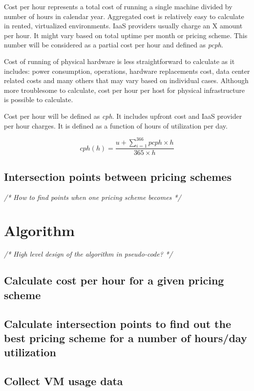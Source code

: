\documentclass[]{final_report}
\begin{document}
Cost per hour represents a total cost of running a single machine divided by number of hours in calendar year. Aggregated cost is relatively easy to calculate in rented, virtualized environments. IaaS providers usually charge an X amount per hour. It might vary based on total uptime per month or pricing scheme. This number will be considered as a partial cost per hour and defined as \textit{pcph}. \par
Cost of running of physical hardware is less straightforward to calculate as it includes: power consumption, operations, hardware replacements cost, data center related costs and many others that may vary based on individual cases. Although more troublesome to calculate, cost per hour per host for physical infrastructure is possible to calculate. \par
Cost per hour will be defined as \textit{cph}. It includes upfront cost and IaaS provider per hour charges. It is defined as a function of hours of utilization per day.  

\begin{equation}
cph(h) = \frac{u + \sum_{i=1}^{366} pcph \times h}{365 \times h}
\end{equation}

\subsection{Intersection points between pricing schemes}
\emph{/* How to find points when one pricing scheme becomes */}

\section{Algorithm}

\emph{/* High level design of the algorithm in pseudo-code? */}

\subsection{Calculate cost per hour for a given pricing scheme}
\subsection{Calculate intersection points to find out the best pricing scheme for a number of hours/day utilization}
\subsection{Collect VM usage data}
\end{document}
